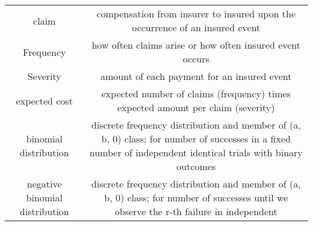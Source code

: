 \documentclass[]{book}
\begin{document}
\begin{longtable}[]{@{}cc@{}}
\toprule
\begin{minipage}[t]{0.43\columnwidth}\centering\strut
claim\strut
\end{minipage} & \begin{minipage}[t]{0.43\columnwidth}\centering\strut
compensation from insurer to insured upon the occurrence of an insured
event\strut
\end{minipage}\tabularnewline
\begin{minipage}[t]{0.43\columnwidth}\centering\strut
Frequency\strut
\end{minipage} & \begin{minipage}[t]{0.43\columnwidth}\centering\strut
how often claims arise or how often insured event occurs\strut
\end{minipage}\tabularnewline
\begin{minipage}[t]{0.43\columnwidth}\centering\strut
Severity\strut
\end{minipage} & \begin{minipage}[t]{0.43\columnwidth}\centering\strut
amount of each payment for an insured event\strut
\end{minipage}\tabularnewline
\begin{minipage}[t]{0.43\columnwidth}\centering\strut
expected cost\strut
\end{minipage} & \begin{minipage}[t]{0.43\columnwidth}\centering\strut
expected number of claims (frequency) times expected amount per claim
(severity)\strut
\end{minipage}\tabularnewline
\begin{minipage}[t]{0.43\columnwidth}\centering\strut
binomial distribution\strut
\end{minipage} & \begin{minipage}[t]{0.43\columnwidth}\centering\strut
discrete frequency distribution and member of (a, b, 0) class; for
number of successes in a fixed number of independent identical trials
with binary outcomes\strut
\end{minipage}\tabularnewline
\begin{minipage}[t]{0.43\columnwidth}\centering\strut
negative binomial distribution\strut
\end{minipage} & \begin{minipage}[t]{0.43\columnwidth}\centering\strut
discrete frequency distribution and member of (a, b, 0) class; for
number of successes until we observe the r-th failure in independent

\end{minipage}
\end{longtable}
\end{document}
